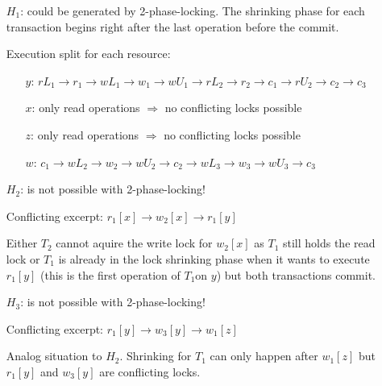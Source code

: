 \documentclass{scrartcl}
\begin{document}
\begin{itemize}
    \item[\(H_1\):] could be generated by 2-phase-locking. The shrinking phase for each transaction begins right after the last operation before the commit.

        Execution split for each resource:

        \begin{itemize}
            \item[\(y\):] \(rL_1 \rightarrow r_1 \rightarrow wL_1 \rightarrow w_1 \rightarrow wU_1 \rightarrow rL_2 \rightarrow r_2 \rightarrow c_1 \rightarrow rU_2 \rightarrow c_2 \rightarrow c_3\)
            \item[\(x\):] only read operations $\Rightarrow$ no conflicting locks possible
            \item[\(z\):] only read operations $\Rightarrow$ no conflicting locks possible
            \item[\(w\):] \(c_1 \rightarrow wL_2 \rightarrow w_2 \rightarrow wU_2 \rightarrow c_2 \rightarrow wL_3 \rightarrow w_3 \rightarrow wU_3 \rightarrow c_3\)
        \end{itemize}

    \item[\(H_2\):] is not possible with 2-phase-locking!

        Conflicting excerpt: \(r_1[x] \rightarrow w_2[x] \rightarrow r_1[y]\)

        Either \(T_2\) cannot aquire the write lock for \(w_2[x]\) as \(T_1\) still holds the read lock or \(T_1\) is already in the lock shrinking phase when it wants to execute \(r_1[y]\) (this is the first operation of \(T_1\)on \(y\)) but both transactions commit.

    \item[\(H_3\):] is not possible with 2-phase-locking!

        Conflicting excerpt: \(r_1[y] \rightarrow w_3[y] \rightarrow w_1[z]\)

        Analog situation to \(H_2\). Shrinking for \(T_1\) can only happen after \(w_1[z]\) but \(r_1[y]\) and \(w_3[y]\) are conflicting locks.


\end{itemize}
\end{document}
